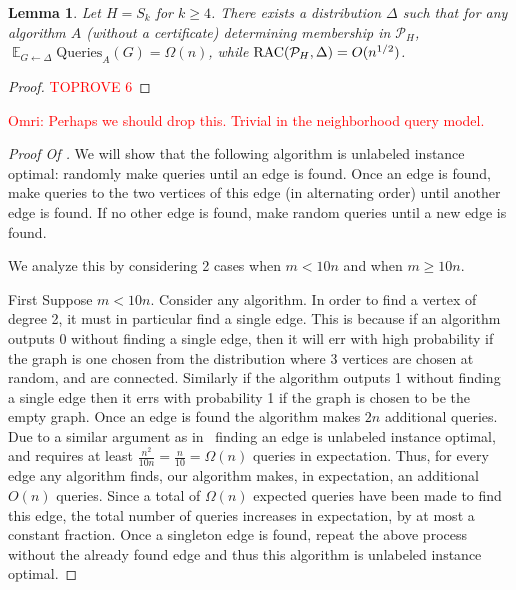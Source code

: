 \documentclass[11pt]{article}
\numberwithin{equation}{section}
\newtheorem{lemma}[lemma]{Lemma}
\newcommand\E{\mathop{\mathbb E}}
\newcommand{\Query}{\text{Queries}}
\renewcommand{\P}{\mathcal{P}}
\newcommand{\1}{\mathbf{1}}
\newcommand\omri[1]{{\textcolor{red}{Omri: #1}}}
\begin{document}
 \begin{lemma} \label{lemma:paths}
Let $H = S_k$ for $k \geq 4$. There exists a distribution $\Delta$ such that for any algorithm $A$ (without a certificate) determining membership in $\P_H$, $\E_{G \leftarrow \Delta} \Query_A(G) = \Omega(n)$, while $\RACC(\P_H,\Delta) = O(n^{1/2})$. 
 \end{lemma}



\begin{proof}\textcolor{red}{TOPROVE 6}\end{proof}

\iffalse
\omri{Perhaps we should drop this. Trivial in the neighborhood query model.}
\begin{proof}[Proof Of ]
We will show that the following algorithm is unlabeled instance optimal: randomly make queries until an edge is found. Once an edge is found, make queries to the two vertices of this edge (in alternating order) until another edge is found. If no other edge is found, make random queries until a new edge is found. 

We analyze this by considering 2 cases when $m < 10n$ and when $m \ge 10n$.

First Suppose $ m <10n$. Consider any algorithm. In order to find a vertex of degree 2, it must in particular find a single edge. This is because if an algorithm outputs 0 without finding a single edge, then it will err with high probability if the graph is one chosen from the distribution where 3 vertices are chosen at random, and are connected. Similarly if the algorithm outputs 1 without finding a single edge then it errs with probability 1 if the graph is chosen to be the empty graph. Once an edge is found the algorithm makes $2n$ additional queries. Due to a similar argument as in~ finding an edge is unlabeled instance optimal, and requires at least $\frac{n^2}{10n} = \frac{n}{10} = \Omega(n)$ queries in expectation. Thus, for every edge any algorithm finds, our algorithm makes, in expectation, an additional $O(n)$ queries.  Since a total of $\Omega(n)$ expected queries have been made to find this edge, the total number of queries increases in expectation, by at most a constant fraction. Once a singleton edge is found, repeat the above process without the already found edge and thus this algorithm is unlabeled instance optimal.


\end{proof}
\end{document}
